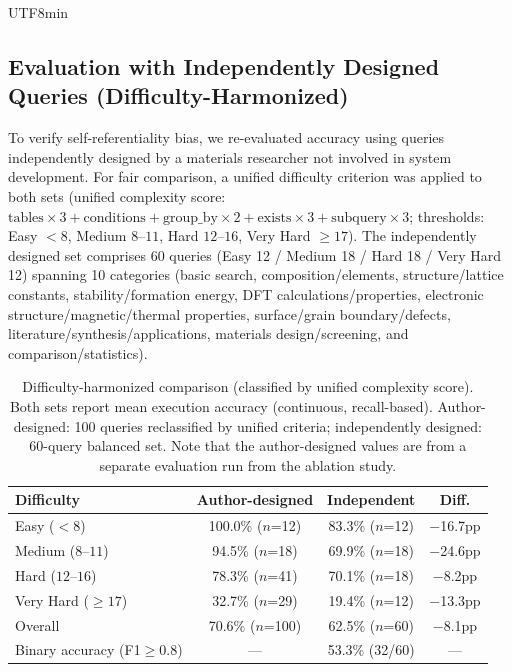 \documentclass[sn-mathphys,Numbered]{sn-jnl}
\begin{document}
\begin{CJK}{UTF8}{min}
\subsection{Evaluation with Independently Designed Queries (Difficulty-Harmonized)}
\label{sec:independent_eval}

To verify self-referentiality bias, we re-evaluated accuracy using
queries independently designed by a materials researcher not
involved in system development.
For fair comparison, a unified difficulty criterion was applied to
both sets (unified complexity score:
$\text{tables} \times 3 + \text{conditions} + \text{group\_by} \times 2
+ \text{exists} \times 3 + \text{subquery} \times 3$;
thresholds: Easy $< 8$, Medium $8$--$11$, Hard $12$--$16$,
Very Hard $\geq 17$).
The independently designed set comprises 60 queries
(Easy 12 / Medium 18 / Hard 18 / Very Hard 12) spanning 10
categories (basic search, composition/elements,
structure/lattice constants, stability/formation energy,
DFT calculations/properties, electronic structure/magnetic/thermal
properties, surface/grain boundary/defects,
literature/synthesis/applications, materials design/screening,
and comparison/statistics).

\begin{table}[t]
  \centering
  \caption{Difficulty-harmonized comparison (classified by unified
  complexity score). Both sets report mean execution accuracy
  (continuous, recall-based). Author-designed: 100 queries
  reclassified by unified criteria; independently designed: 60-query
  balanced set. Note that the author-designed values are from a
  separate evaluation run from the ablation study.}
  \label{tab:independent_eval}
  \footnotesize
  \begin{tabular}{lccc}
    \toprule
    Difficulty & Author-designed & Independent & Diff. \\
    \midrule
    Easy ($< 8$)       & 100.0\% ($n$=12) & 83.3\% ($n$=12)  & $-$16.7pp \\
    Medium ($8$--$11$) &  94.5\% ($n$=18) & 69.9\% ($n$=18)  & $-$24.6pp \\
    Hard ($12$--$16$)  &  78.3\% ($n$=41) & 70.1\% ($n$=18)  & $-$8.2pp \\
    Very Hard ($\geq 17$) & 32.7\% ($n$=29) & 19.4\% ($n$=12) & $-$13.3pp \\
    \midrule
    Overall               &  70.6\% ($n$=100) & 62.5\% ($n$=60) & $-$8.1pp \\
    Binary accuracy (F1$\geq 0.8$) & --- & 53.3\% (32/60) & --- \\
    \bottomrule
  \end{tabular}
\end{table}


\end{CJK}
\end{document}
